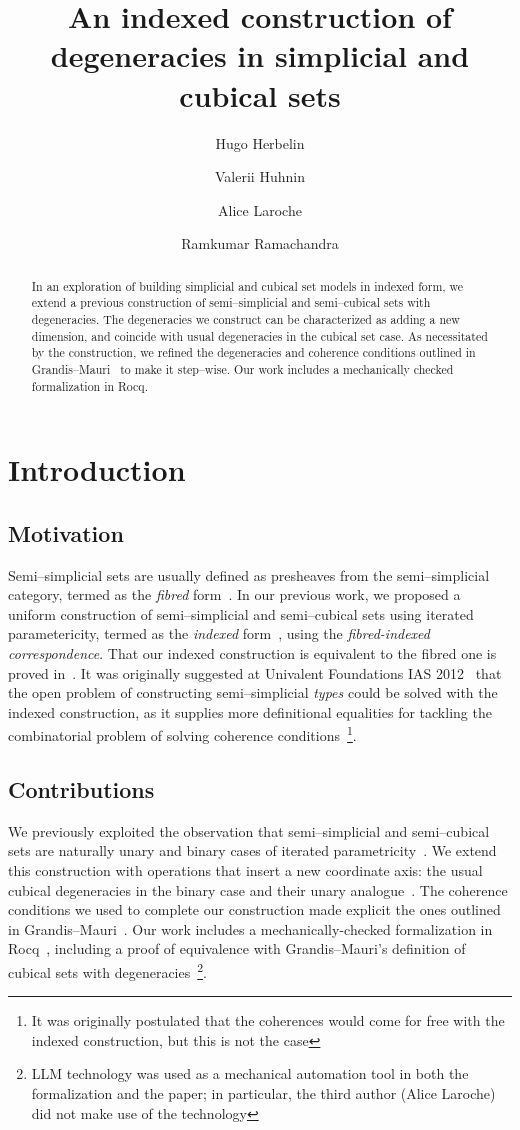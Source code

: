 \documentclass[a4paper,UKenglish,cleveref,autoref]{lipics-v2021}
\title{An indexed construction of degeneracies in simplicial and cubical sets}
\author{Hugo Herbelin}{Université Paris Cité, Inria, CNRS, IRIF, Paris, France}{Hugo.Herbelin@inria.fr}{}{}
\author{Valerii Huhnin}{Université Paris Cité, Paris, France}{valerii.huhnin@etu.u-paris.fr}{}{}
\author{Alice Laroche}{Université Paris Cité, Paris, France}{alice.laroche@etu.u-paris.fr}{}{}
\author{Ramkumar Ramachandra}{Unaffiliated, London, United Kingdom}{r@artagnon.com}{}{}
\newcommand{\linkicon}{\texorpdfstring{\faLink}{🔗}}
\begin{document}
\maketitle

\begin{abstract}
  In an exploration of building simplicial and cubical set models in indexed form, we extend a previous construction of semi--simplicial and semi--cubical sets with degeneracies. The degeneracies we construct can be characterized as adding a new dimension, and coincide with usual degeneracies in the cubical set case. As necessitated by the construction, we refined the degeneracies and coherence conditions outlined in Grandis--Mauri~\cite{grandis03} to make it step--wise. Our work includes a mechanically checked formalization in Rocq.
\end{abstract}

\section{Introduction}
\subsection{Motivation}
Semi--simplicial sets are usually defined as presheaves from the semi--simplicial category, termed as the \emph{fibred} form~\cite{rourkesanderson71}. In our previous work, we proposed a uniform construction of semi--simplicial and semi--cubical sets using iterated parametericity, termed as the \emph{indexed} form~\cite{hr25}, using the \emph{fibred-indexed correspondence}. That our indexed construction is equivalent to the fibred one is proved in~\cite{Laroche26}. It was originally suggested at Univalent Foundations IAS 2012~\cite{UFwiki2012} that the open problem of constructing semi--simplicial \emph{types} could be solved with the indexed construction, as it supplies more definitional equalities for tackling the combinatorial problem of solving coherence conditions~\footnote{It was originally postulated that the coherences would come for free with the indexed construction, but this is not the case}.

\subsection{Contributions}
We previously exploited the observation that semi--simplicial and semi--cubical sets are naturally unary and binary cases of iterated parametricity~\cite{hr25}. We extend this construction with operations that insert a new coordinate axis: the usual cubical degeneracies in the binary case and their unary analogue~\cite{bernardy15,bernardy12}. The coherence conditions we used to complete our construction made explicit the ones outlined in Grandis--Mauri~\cite{grandis03}. Our work includes a mechanically-checked formalization in Rocq~\href{https://github.com/artagnon/bonak}{\linkicon}, including a proof of equivalence with Grandis--Mauri's definition of cubical sets with degeneracies~\footnote{LLM technology was used as a mechanical automation tool in both the formalization and the paper; in particular, the third author (Alice Laroche) did not make use of the technology}.
\end{document}

